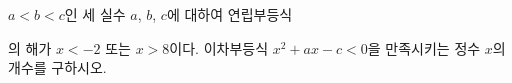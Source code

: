 $a<b<c$인 세 실수 $a$, $b$, $c$에 대하여 연립부등식 \par\smallskip{}\par\smallskip\noindent 의 해가 $x<-2$ 또는 $x>8$이다. 이차부등식 $x^2+ax-c<0$을 만족시키는 정수 $x$의 개수를 구하시오.
